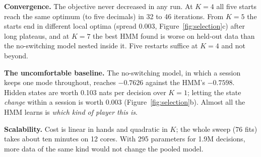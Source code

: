 \documentclass{article}
\begin{document}
\textbf{Convergence.} The objective never decreased in any run. At $K=4$ all five starts reach the same optimum (to five decimals) in 32 to 46 iterations. From $K=5$ the starts end in different local optima (spread 0.003, Figure~\ref{fig:selection}c) after long plateaus, and at $K=7$ the best HMM found is worse on held-out data than the no-switching model nested inside it. Five restarts suffice at $K=4$ and not beyond.

\textbf{The uncomfortable baseline.} The no-switching model, in which a session keeps one mode throughout, reaches $-0.7626$ against the HMM's $-0.7598$. Hidden states are worth 0.103 nats per decision over $K=1$; letting the state \emph{change} within a session is worth 0.003 (Figure~\ref{fig:selection}b). Almost all the HMM learns is \emph{which kind of player this is}.

\textbf{Scalability.} Cost is linear in hands and quadratic in $K$; the whole sweep (76 fits) takes about ten minutes on 12 cores. With 295 parameters for 1.9M decisions, more data of the same kind would not change the pooled model.
\end{document}
